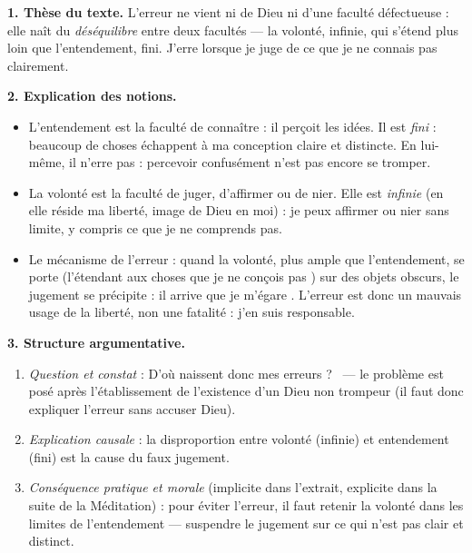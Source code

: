 \documentclass[11pt]{article}
\newcommand{\cle}[1]{{\popxbold\color{popdark}#1}}
\begin{document}
\begin{corrige}
\textbf{1. Thèse du texte.} L'erreur ne vient ni de Dieu ni d'une faculté défectueuse : elle naît du \emph{déséquilibre} entre deux facultés — la volonté, infinie, qui s'étend plus loin que l'entendement, fini. J'erre lorsque je juge de ce que je ne connais pas clairement.

\textbf{2. Explication des notions.}
\begin{itemize}
\item L'\cle{entendement} est la faculté de connaître : il perçoit les idées. Il est \emph{fini} : beaucoup de choses échappent à ma conception claire et distincte. En lui-même, il n'erre pas : percevoir confusément n'est pas encore se tromper.
\item La \cle{volonté} est la faculté de juger, d'affirmer ou de nier. Elle est \emph{infinie} (en elle réside ma liberté, image de Dieu en moi) : je peux affirmer ou nier sans limite, y compris ce que je ne comprends pas.
\item Le mécanisme de l'erreur : quand la volonté, plus ample que l'entendement, se porte (\guillemotleft l'étendant aux choses que je ne conçois pas \guillemotright) sur des objets obscurs, le jugement se précipite : \guillemotleft il arrive que je m'égare \guillemotright. L'erreur est donc un mauvais usage de la liberté, non une fatalité : j'en suis responsable.
\end{itemize}

\textbf{3. Structure argumentative.}
\begin{enumerate}
\item \emph{Question et constat} : \guillemotleft D'où naissent donc mes erreurs ? \guillemotright\ — le problème est posé après l'établissement de l'existence d'un Dieu non trompeur (il faut donc expliquer l'erreur sans accuser Dieu).
\item \emph{Explication causale} : la disproportion entre volonté (infinie) et entendement (fini) est la cause du faux jugement.
\item \emph{Conséquence pratique et morale} (implicite dans l'extrait, explicite dans la suite de la Méditation) : pour éviter l'erreur, il faut retenir la volonté dans les limites de l'entendement — suspendre le jugement sur ce qui n'est pas clair et distinct.
\end{enumerate}


\end{corrige}
\end{document}
